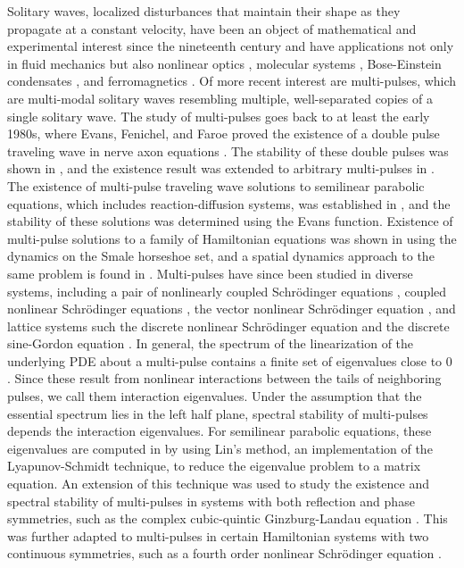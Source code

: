 \documentclass[12pt]{elsarticle}
\theoremstyle{plain}
\theoremstyle{definition}
\theoremstyle{remark}
\numberwithin{theorem}{section}
\numberwithin{equation}{section}
\begin{document}
Solitary waves, localized disturbances that maintain their shape as they propagate at a constant velocity, have been an object of mathematical and experimental interest since the nineteenth century \cite{KdVoriginal} and have applications not only in fluid mechanics but also nonlinear optics \cite{Taylor1992}, molecular systems \cite{Davydov1985}, Bose-Einstein condensates \cite{Panos2008BEC}, and ferromagnetics \cite{Kosevich1998}. Of more recent interest are multi-pulses, which are multi-modal solitary waves resembling multiple, well-separated copies of a single solitary wave. The study of multi-pulses goes back to at least the early 1980s, where Evans, Fenichel, and Faroe proved the existence of a double pulse traveling wave in nerve axon equations \cite{Evans1982}. The stability of these double pulses was shown in \cite{Yanagida1989}, and the existence result was extended to arbitrary multi-pulses in \cite{Feroe1986}. The existence of multi-pulse traveling wave solutions to semilinear parabolic equations, which includes reaction-diffusion systems, was established in \cite{Alexander1994}, and the stability of these solutions was determined using the Evans function. Existence of multi-pulse solutions to a family of Hamiltonian equations was shown in \cite{Buffoni1996} using the dynamics on the Smale horseshoe set, and a spatial dynamics approach to the same problem is found in \cite{SandstedeStrut}. Multi-pulses have since been studied in diverse systems, including a pair of nonlinearly coupled Schr\"{o}dinger equations \cite{Yew2001,Yew2000}, coupled nonlinear Schr\"{o}dinger equations \cite{Pelinovsky2001,Pelinovsky2005}, the vector nonlinear Schr\"{o}dinger equation \cite{Kapitula2007}, and lattice systems such the discrete nonlinear Schr\"{o}dinger equation \cite{parkerlattice} and the discrete sine-Gordon equation \cite{ParkerSineGordon}. In general, the spectrum of the linearization of the underlying PDE about a multi-pulse contains a finite set of eigenvalues close to 0 \cite{Alexander1990,Sandstede1998}. Since these result from nonlinear interactions between the tails of neighboring pulses, we call them interaction eigenvalues. Under the assumption that the essential spectrum lies in the left half plane, spectral stability of multi-pulses depends the interaction eigenvalues. For semilinear parabolic equations, these eigenvalues are computed in \cite{Sandstede1998} by using Lin's method, an implementation of the Lyapunov-Schmidt technique, to reduce the eigenvalue problem to a matrix equation. An extension of this technique was used to study the existence and spectral stability of multi-pulses in systems with both reflection and phase symmetries, such as the complex cubic-quintic Ginzburg-Landau equation \cite{Manukian2009}. This was further adapted to multi-pulses in certain Hamiltonian systems with two continuous symmetries, such as a fourth order nonlinear Schr\"{o}dinger equation \cite{ParkerAceves2021}.
\end{document}

